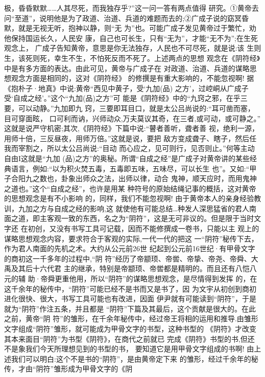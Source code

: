 \documentclass[12pt,UTF8]{ctexbook}
\begin{document}
极，昏昏默默……人其尽死，而我独存乎?”这一问一答有两点值得
研究。①黄帝去问“至道”，说明他是为了政道、治道、兵道的难题而去的;②广成子说的窈冥昏默，就是无视无听，抱神以静，则“无
为”也。可能广成子发见黄帝过于繁忙，劝他保持国运长久，人民安
康，自己也可长生，只有“无为”，才能“无不为”;在生死观念上，
广成子告知黄帝，意思是你无法独存，人民也不可尽死，就是说:该
生则生，该死则死，幸生不生，不怕死反而不死了。上述两点的思想
观念在《阴符经》中是有多方面的表达。由此可见，黄帝与广成子在
对政道、治道、兵道的谋略思想观念方面是相同的，这对《阴符经》
的修撰是有重大影响的，不能忽视啊!
据《抱朴子·地真》中说:黄帝“西见中黄子，受‘九加(品)
之方’，过崆峒从广成子受‘自成之经’。”这个“九加(品)之方”可
能是《阴符经》中的“九窍之邪，在乎三要，可以动静。”九加即九
窍，三要即耳目口，就是太公吕尚说的:“耳可凿而塞，目可穿面眩，
口可利而讷，兴师动众,万夫莫议其奇，在三者,或可动，或可静之。”
这就是说严守机密;其次,《阴符经》下篇中说:“瞽者善听，聋者善
视，绝利一源，用师十倍，三反昼夜，用师万倍。”这就是说，要把
敌方变成聋子、瞎子，然后任我而宰割之，所以太公吕尚说:“目动
而心应之，见可则行，见否则止。”何等主动自由I这就是“九加
(品)之方”的奥秘。所谓“自成之经”是广成子对黄帝讲的某些经
典语言，例如:“以为积火焚五毒，五毒即五味，五味尽，可以长生
也”。又如:“甲子合阳九之数也，卦象出师众之法，出师以律，动合
鬼神，顺天应时，而用鬼神之道也。”这个“自成之经”，也许是用某
种符号的原始结绳记事的概括，这对黄帝的思想观念是有不小影响
的，同样，我们不能忽视啊!
由于黄帝本人的亲身经验教训，九加之方与自成之经的影响,这
就使他有可能总结…种发人深思猛省的君人南面之道，即主客观一致的东西，名之为“阴符”，这是无可非议的。但是限于当时文字还
在初创，又没有书写工具可记载，因而不能修撰成一卷书，只能以主
观上的谋略思想观念内容，要求符合于客观的实际,一代一代的把这
一“阴符”秘传下去，作为君人南面的先机之术。大约从公元前26世
纪起到公元前16世纪·有甲骨文字的商初这一千多年的过程中,“阴
符”经历了帝颛顼、帝喾、帝挚、帝尧、帝舜、大禹及其后十六代君
主的继承，特别是帝颛顼、帝喾都是精明的。而且还有八恺八元的辅
助·帝舜更重他用，所以“阴符”的谋略思想观念，是尽情得到发挥
的，在这千余年的秘传中，“阴符”可能已经不是书而又是书了，因
为文宇从初创到商初进化很快、很大，书写工具可能也有改进，因面
伊尹就有可能读到“阴符”，于是就为“阴符”作注五条，并且都是
“阴符”下篇及其最后，这个贡献是很大的。在此之前，黄帝“阴
符”的雏形，在千余年秘传中，经过帝王将相的运用和推导.由雏形
文字组成“阴符”雏形，就可能成为甲骨文字的书型，这种书型的
《阴符》才改变其本来面目“阴符”为书型《阴符》，在商代之前就已
完成《阴符》书型的书,但还不是象我们今天所理想见到的书型的书，
要知道它是用甲骨文字组成的书啊!
由上述我们可以明白:这个不是书的“阴符”，是由黄帝定下来
的雏形，经过千余年的秘传，才由“阴符”雏形成为甲骨文字的《阴
\end{document}
